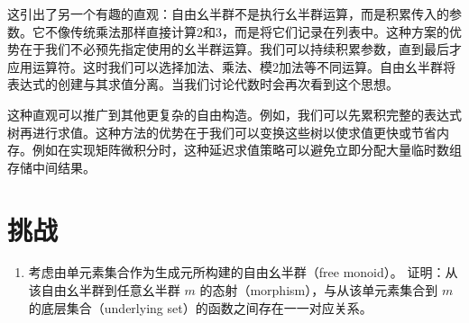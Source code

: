 这引出了另一个有趣的直观：自由幺半群不是执行幺半群运算，而是积累传入的参数。它不像传统乘法那样直接计算$2$和$3$，而是将它们记录在列表中。这种方案的优势在于我们不必预先指定使用的幺半群运算。我们可以持续积累参数，直到最后才应用运算符。这时我们可以选择加法、乘法、模2加法等不同运算。自由幺半群将表达式的创建与其求值分离。当我们讨论代数时会再次看到这个思想。

这种直观可以推广到其他更复杂的自由构造。例如，我们可以先累积完整的表达式树再进行求值。这种方法的优势在于我们可以变换这些树以使求值更快或节省内存。例如在实现矩阵微积分时，这种延迟求值策略可以避免立即分配大量临时数组存储中间结果。

\section{挑战}

\begin{enumerate}
  \tightlist
  \item
        考虑由单元素集合作为生成元所构建的自由幺半群（free monoid）。
        证明：从该自由幺半群到任意幺半群 $ m $ 的态射（morphism），与从该单元素集合到 $ m $ 的底层集合（underlying set）的函数之间存在一一对应关系。
\end{enumerate}